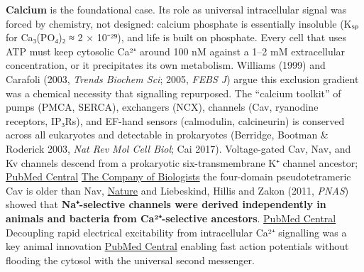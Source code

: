 \textbf{Calcium} is the foundational case. Its role as universal intracellular signal was forced by chemistry, not designed: calcium phosphate is essentially insoluble (Kₛₚ for Ca₃(PO₄)₂ ≈ 2 × 10⁻²⁹), and life is built on phosphate. Every cell that uses ATP must keep cytosolic Ca²⁺ around 100 nM against a 1--2 mM extracellular concentration, or it precipitates its own metabolism. Williams (1999) and Carafoli (2003, \emph{Trends Biochem Sci}; 2005, \emph{FEBS J}) argue this exclusion gradient was a chemical necessity that signalling repurposed. The ``calcium toolkit'' of pumps (PMCA, SERCA), exchangers (NCX), channels (Cav, ryanodine receptors, IP₃Rs), and EF-hand sensors (calmodulin, calcineurin) is conserved across all eukaryotes and detectable in prokaryotes (Berridge, Bootman \& Roderick 2003, \emph{Nat Rev Mol Cell Biol}; Cai 2017). Voltage-gated Cav, Nav, and Kv channels descend from a prokaryotic six-transmembrane K⁺ channel ancestor; \href{https://pmc.ncbi.nlm.nih.gov/articles/PMC12862854/}{PubMed Central} \href{https://journals.biologists.com/jeb/article/218/4/515/14125/Evolution-of-voltage-gated-ion-channels-at-the}{The Company of Biologists} the four-domain pseudotetrameric Cav is older than Nav, \href{https://www.nature.com/articles/s41598-018-21897-7}{Nature} and Liebeskind, Hillis and Zakon (2011, \emph{PNAS}) showed that \textbf{Na⁺-selective channels were derived independently in animals and bacteria from Ca²⁺-selective ancestors}. \href{https://pmc.ncbi.nlm.nih.gov/articles/PMC7723092/}{PubMed Central} Decoupling rapid electrical excitability from intracellular Ca²⁺ signalling was a key animal innovation \href{https://pmc.ncbi.nlm.nih.gov/articles/PMC7723092/}{PubMed Central} enabling fast action potentials without flooding the cytosol with the universal second messenger.

